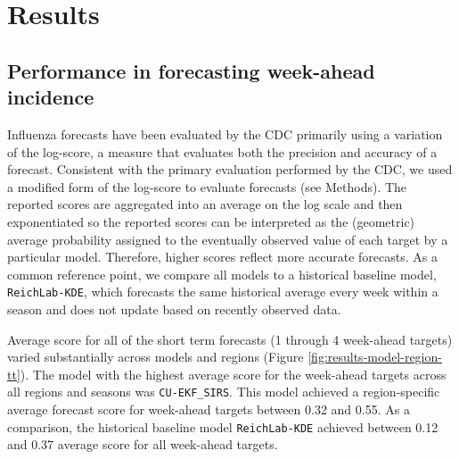 \documentclass[9pt,twocolumn,twoside]{pnas-new}\usepackage[]{graphicx}\usepackage[]{color}
\begin{document}
\section*{Results}


\subsection*{Performance in forecasting week-ahead incidence}

Influenza forecasts have been evaluated by the CDC primarily using a variation of the log-score, a measure that evaluates both the precision and accuracy of a forecast.\cite{Gneiting2007} 
Consistent with the primary evaluation performed by the CDC, we used a modified form of the log-score to evaluate forecasts (see Methods). 
The reported scores are aggregated into an average on the log scale and then exponentiated so the reported scores can be interpreted as the (geometric) average probability assigned to the eventually observed value of each target by a particular model. 
Therefore, higher scores reflect more accurate forecasts. 
As a common reference point, we compare all models to a historical baseline model, {\tt ReichLab-KDE}, which forecasts the same historical average every week within a season and does not update based on recently observed data.



Average score for all of the short term forecasts (1 through 4 week-ahead targets) varied substantially across models and regions (Figure \ref{fig:results-model-region-tt}).
The model with the highest average score for the week-ahead targets across all regions and seasons was {\tt CU-EKF\_SIRS}.
This model achieved a region-specific average forecast score for week-ahead targets between
0.32 
and 
0.55.
As a comparison, the historical baseline model {\tt ReichLab-KDE} achieved between
0.12 and
0.37
average score for all week-ahead targets.
\end{document}
